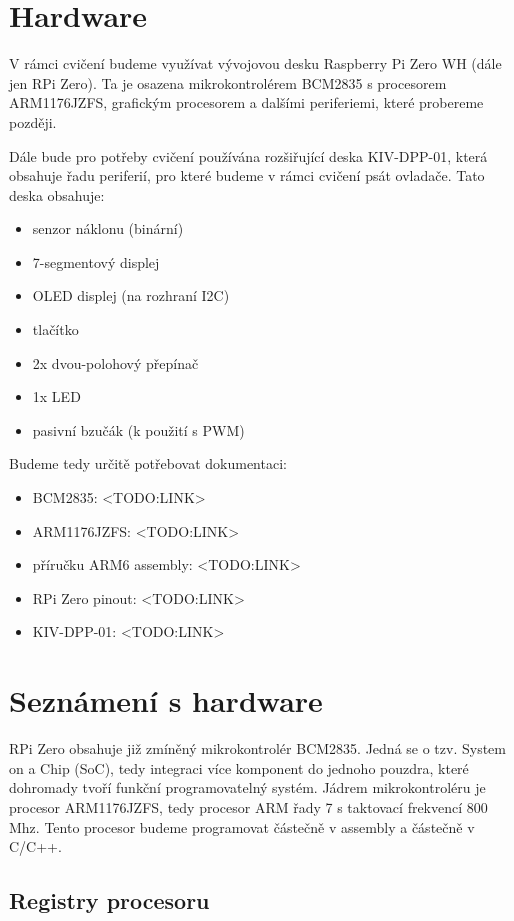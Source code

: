 \documentclass{article}
\begin{document}
\section{Hardware}

V rámci cvičení budeme využívat vývojovou desku Raspberry Pi Zero WH (dále jen RPi Zero). Ta je osazena mikrokontrolérem BCM2835 s procesorem ARM1176JZFS, grafickým procesorem a dalšími periferiemi, které probereme později.

Dále bude pro potřeby cvičení používána rozšiřující deska KIV-DPP-01, která obsahuje řadu periferií, pro které budeme v rámci cvičení psát ovladače. Tato deska obsahuje:\\
\begin{itemize}
	\item senzor náklonu (binární)
	\item 7-segmentový displej
	\item OLED displej (na rozhraní I2C)
	\item tlačítko
	\item 2x dvou-polohový přepínač
	\item 1x LED
	\item pasivní bzučák (k použití s PWM)
\end{itemize}
Budeme tedy určitě potřebovat dokumentaci:

\begin{itemize}
	\item BCM2835: <TODO:LINK>
	\item ARM1176JZFS: <TODO:LINK>
	\item příručku ARM6 assembly: <TODO:LINK>
	\item RPi Zero pinout: <TODO:LINK>
	\item KIV-DPP-01: <TODO:LINK>
\end{itemize}

\section{Seznámení s hardware}

RPi Zero obsahuje již zmíněný mikrokontrolér BCM2835. Jedná se o tzv. System on a Chip (SoC), tedy integraci více komponent do jednoho pouzdra, které dohromady tvoří funkční programovatelný systém. Jádrem mikrokontroléru je procesor ARM1176JZFS, tedy procesor ARM řady 7 s taktovací frekvencí 800 Mhz. Tento procesor budeme programovat částečně v assembly a částečně v C/C++.

\subsection{Registry procesoru}
\end{document}
